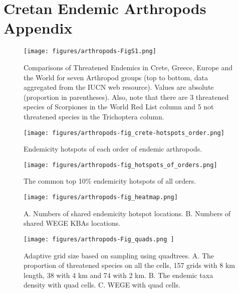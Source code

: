 
\chapter{Cretan Endemic Arthropods Appendix} %

\label{AppendixC} 


   \begin{figure}[ht]
      \centering
      \texttt{[image: figures/arthropods-FigS1.png]}
      \caption[Comparisons of Threatened Endemics in Crete, Greece, Europe and the World]{Comparisons of Threatened Endemics in Crete, Greece, Europe and the World for seven Arthropod groups (top to bottom, data aggregated from the IUCN web resource). Values are absolute (proportion in parentheses). Also, note that there are 3 threatened species of Scorpiones in the World Red List column and 5 not threatened species in the Trichoptera column.}
      \label{fig:arthropods-figS1}
   \end{figure}

   \begin{figure}[ht]
      \centering
      \texttt{[image: figures/arthropods-fig\_crete-hotspots\_order.png]}
      \caption[Endemicity hotspots of each order of endemic arthropods]{Endemicity hotspots of each order of endemic arthropods.}
      \label{fig:arthropods-figS2}
   \end{figure}

   \begin{figure}[ht]
      \centering
      \texttt{[image: figures/arthropods-fig\_hotspots\_of\_orders.png]}
      \caption[The common endemicity hotspots of all orders]{The common top 10\% endemicity hotspots of all orders.}
      \label{fig:arthropods-figS3}
   \end{figure}

   \begin{figure}[ht]
      \centering
      \texttt{[image: figures/arthropods-fig\_heatmap.png]}
      \caption[Heatmaps of shared hotspots and KBEs]{A. Numbers of shared endemicity hotspot locations. B. Numbers of shared WEGE KBAs locations.}
      \label{fig:arthropods-figS4}
   \end{figure}

   \begin{figure}[ht]
      \centering
      \texttt{[image: figures/arthropods-Fig\_quads.png ]}
      \caption[Adaptive grid size based on sampling using quadtrees]{Adaptive grid size based on sampling using quadtrees. A. The proportion of threatened species on all the cells, 157 grids with 8 km length, 38 with 4 km and 74 with 2 km. B. The endemic taxa density with quad cells. C. WEGE with quad cells.}
      \label{fig:arthropods-figS5}
   \end{figure}


